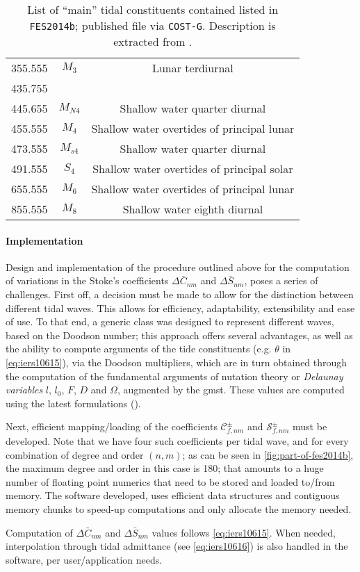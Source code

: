 \begin{table}[]
\begin{tabular}{ccc}
      355.555 & $M_3$ & Lunar terdiurnal \\
      435.755 & & \\
      445.655 & $M_{N4}$ & Shallow water quarter diurnal \\
      455.555 & $M_4$ & Shallow water overtides of principal lunar \\
      473.555 & $M_{s4}$ & Shallow water quarter diurnal \\
      491.555 & $S_4$ & Shallow water overtides of principal solar \\
      655.555 & $M_6$ & Shallow water overtides of principal lunar \\
      855.555 & $M_8$ & Shallow water eighth diurnal\\
      \hline
  \end{tabular}
  \caption{List of ``main'' tidal constituents contained listed in \texttt{FES2014b}; published 
    file via \texttt{COST-G}. Description is extracted from \cite{Beauducel2023}.}
  \label{table:tidal-constituents-fes14b}
\end{table}

\paragraph{Implementation}\label{par:ocean-tide-acceleration-implementation}
Design and implementation of the procedure outlined above for the computation of 
variations in the Stoke's coefficients $\Delta \bar{C}_{nm}$ and $\Delta \bar{S}_{nm}$, 
poses a series of challenges. First off, a decision must be made to allow for the 
distinction between different tidal waves. This allows for efficiency, adaptability, 
extensibility and ease of use. To that end, a generic class was designed to represent 
different waves, based on the Doodson number; this approach offers several advantages, 
as well as the ability to compute arguments of the tide constituents (e.g. $\theta$ 
in \autoref{eq:iers10615}), via the Doodson multipliers, which are in turn obtained 
through the computation of the fundamental arguments of nutation theory or 
\emph{Delaunay variables} $l$, $l_0$, $F$, $D$ and $\Omega$, augmented by the \gls{gmst}. 
These values are computed using the latest formulations (\cite{iers2010}).

Next, efficient mapping/loading of the coefficients $\mathcal{C}_{f,nm}^{\pm}$ and 
$\mathcal{S}_{f,nm}^{\pm}$ must be developed. Note that we have four such coefficients 
per tidal wave, and for every combination of degree and order $(n,m)$; as can be seen 
in \autoref{fig:part-of-fes2014b}, the maximum degree and order in this case is 180;
that amounts to a huge number of floating point numerics that need to be stored 
and loaded to/from memory. The software developed, uses efficient data structures and 
contiguous memory chunks to speed-up computations and only allocate the memory needed.

Computation of $\Delta \bar{C}_{nm}$ and $\Delta \bar{S}_{nm}$ values follows 
\autoref{eq:iers10615}. When needed, interpolation through tidal admittance (see 
\autoref{eq:iers10616}) is also handled in the software, per user/application needs. 